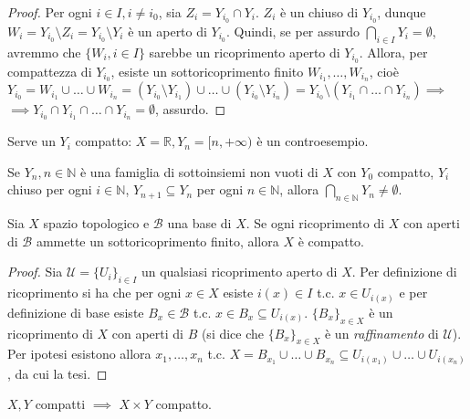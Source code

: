 \begin{proof}
  Per ogni $i \in I, i \not=i_0$, sia $Z_i=Y_{i_0} \cap Y_i$. $Z_i$ è un chiuso di $Y_{i_0}$, dunque $W_i=Y_{i_0} \setminus Z_i=Y_{i_0} \setminus Y_i$ è un aperto di $Y_{i_0}$. Quindi, se per assurdo $\displaystyle \bigcap_{i \in I} Y_i=\emptyset$, avremmo che $\{W_i, i \in I\}$ sarebbe un ricoprimento aperto di $Y_{i_0}$.
  Allora, per compattezza di $Y_{i_0}$, esiste un sottoricoprimento finito $W_{i_1}, \dots, W_{i_n}$,
  cioè $Y_{i_0}=W_{i_1} \cup \dots \cup W_{i_n}=(Y_{i_0} \setminus Y_{i_1}) \cup \dots \cup (Y_{i_0} \setminus Y_{i_n})=Y_{i_0} \setminus (Y_{i_1} \cap \dots \cap Y_{i_n}) \implies$
  $\implies Y_{i_0} \cap Y_{i_1} \cap \dots \cap Y_{i_n}=\emptyset$, assurdo.
\end{proof}

\begin{ex}
  Serve un $Y_i$ compatto: $X=\mathbb{R}, Y_n=[n, +\infty)$ è un controesempio. \marginpar\warningsign
\end{ex}

\begin{cor}
  Se $Y_n, n \in \mathbb{N}$ è una famiglia di sottoinsiemi non vuoti di $X$ con $Y_0$ compatto, $Y_i$ chiuso per ogni $i \in \mathbb{N}$, $Y_{n+1} \subseteq Y_n$ per ogni $n \in \mathbb{N}$, allora $\displaystyle \bigcap_{n \in \mathbb{N}} Y_n \not= \emptyset$.
\end{cor}

\begin{lm} \label{comp_base}
  Sia $X$ spazio topologico e $\mathcal{B}$ una base di $X$. Se ogni ricoprimento di $X$ con aperti di $\mathcal{B}$ ammette un sottoricoprimento finito, allora $X$ è compatto.
\end{lm}

\begin{proof}
  Sia $\mathcal{U}=\{U_i\}_{i \in I}$ un qualsiasi ricoprimento aperto di $X$. Per definizione di ricoprimento si ha che per ogni $x \in X$ esiste $i(x) \in I$ t.c. $x \in U_{i(x)}$ e per definizione di base esiste $B_x \in \mathcal{B}$ t.c. $x \in B_x \subseteq U_{i(x)}$.
  $\{B_x\}_{x \in X}$ è un ricoprimento di $X$ con aperti di $B$ (si dice che $\{B_x\}_{x \in X}$ è un \textit{raffinamento} di $\mathcal{U}$).
  Per ipotesi esistono allora $x_1, \dots, x_n$ t.c. $X=B_{x_1} \cup \dots \cup B_{x_n} \subseteq U_{i(x_1)} \cup \dots \cup U_{i(x_n)}$, da cui la tesi.
\end{proof}

\begin{thm} \label{prod_comp}
  $X, Y$ compatti $\implies$ $X \times Y$ compatto.
\end{thm}

